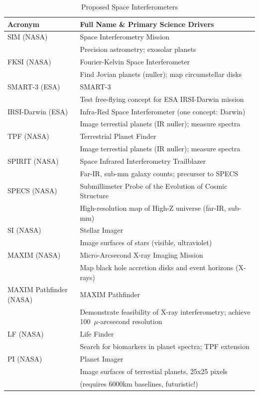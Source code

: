 \documentclass[12pt]{iopart}
\begin{document}
\begin{table}

\footnotesize
\caption {Proposed Space Interferometers}
\label{table:space_interferometers}
\begin{center}
\begin{tabular}{l|l}
\footnotesize

Acronym  & Full Name \&   Primary Science Drivers \\
\hline
SIM (NASA) & Space Interferometry Mission  \\
& Precision astrometry; exosolar planets \\
\hline
FKSI (NASA) & Fourier-Kelvin Space Interferometer \\
& Find Jovian planets (nuller); map circumstellar disks \\
\hline
SMART-3 (ESA) & SMART-3 \\ 
 & Test free-flying concept for ESA IRSI-Darwin mission \\
\hline
IRSI-Darwin (ESA) & Infra-Red Space Interferometer (one concept: Darwin) \\
& Image terrestial planets (IR nuller); measure spectra\\
\hline
TPF (NASA) & Terrestrial Planet Finder \\
& Image terrestial planets (IR nuller); measure spectra \\
\hline
SPIRIT (NASA) & Space Infrared Interferometry Trailblazer  \\
 & Far-IR, sub-mm galaxy counts; precurser to SPECS \\
\hline
SPECS (NASA) & Submillimeter Probe of the Evolution of Cosmic Structure\\
 & High-resolution map of High-Z universe (far-IR, sub-mm) \\
\hline
SI (NASA) & Stellar Imager \\
 & Image surfaces of stars (visible, ultraviolet) \\
\hline
MAXIM (NASA) & Micro-Arcsecond X-ray Imaging Mission \\
 & Map black hole accretion disks and event horizons (X-rays) \\
\hline
MAXIM Pathfinder (NASA) & MAXIM Pathfinder \\
 & Demonstrate feasibility of X-ray interferometry; achieve 100~$\mu$-arcsecond 
resolution\\
\hline
LF (NASA) & Life Finder  \\
 & Search for biomarkers in planet spectra; TPF extension \\
\hline
PI (NASA) & Planet Imager  \\
 &Image surfaces of terrestial planets, 25x25 pixels \\
& (requires 6000km baselines, futuristic!) \\
\hline
\end{tabular}
\end{center}

\end{table}
\end{document}
